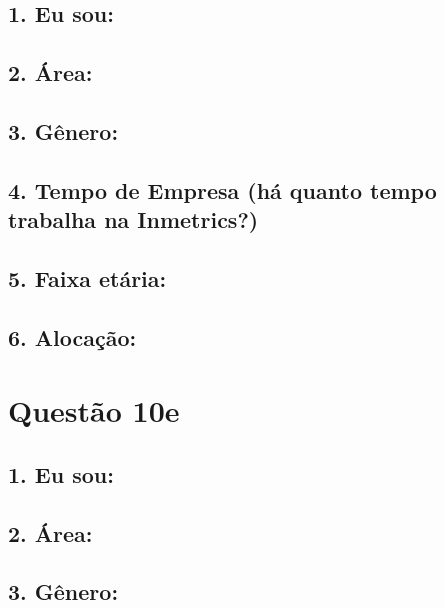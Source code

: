 \documentclass[]{book}
\begin{document}
\hypertarget{eu-sou-5}{%
\subsection{1. Eu sou:}\label{eu-sou-5}}

\hypertarget{area-5}{%
\subsection{2. Área:}\label{area-5}}

\hypertarget{genero-5}{%
\subsection{3. Gênero:}\label{genero-5}}

\hypertarget{tempo-de-empresa-ha-quanto-tempo-trabalha-na-inmetrics-5}{%
\subsection{4. Tempo de Empresa (há quanto tempo trabalha na Inmetrics?)}\label{tempo-de-empresa-ha-quanto-tempo-trabalha-na-inmetrics-5}}

\hypertarget{faixa-etaria-5}{%
\subsection{5. Faixa etária:}\label{faixa-etaria-5}}

\hypertarget{alocacao-5}{%
\subsection{6. Alocação:}\label{alocacao-5}}

\hypertarget{questao-10e}{%
\section{Questão 10e}\label{questao-10e}}

\hypertarget{eu-sou-6}{%
\subsection{1. Eu sou:}\label{eu-sou-6}}

\hypertarget{area-6}{%
\subsection{2. Área:}\label{area-6}}

\hypertarget{genero-6}{%
\subsection{3. Gênero:}\label{genero-6}}
\end{document}
